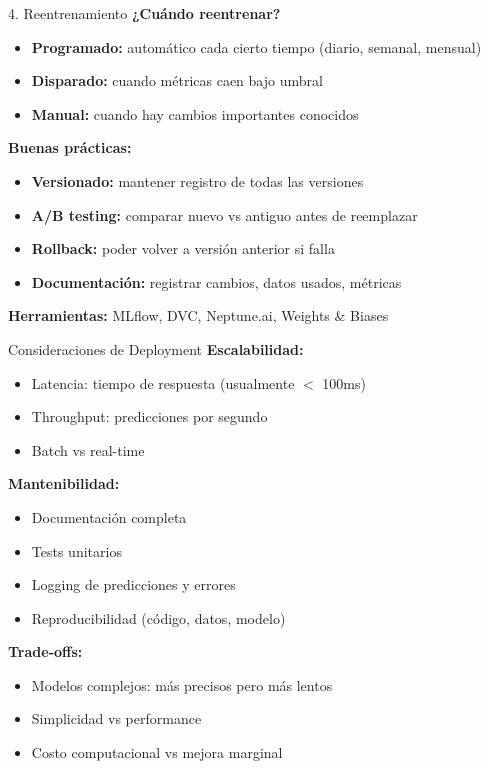 \documentclass[aspectratio=169]{beamer}
\begin{document}
\begin{frame}{4. Reentrenamiento}
\textbf{¿Cuándo reentrenar?}

\begin{itemize}
\item \textbf{Programado:} automático cada cierto tiempo (diario, semanal, mensual)
\item \textbf{Disparado:} cuando métricas caen bajo umbral
\item \textbf{Manual:} cuando hay cambios importantes conocidos
\end{itemize}

\vspace{0.3cm}

\textbf{Buenas prácticas:}
\begin{itemize}
\item \textbf{Versionado:} mantener registro de todas las versiones
\item \textbf{A/B testing:} comparar nuevo vs antiguo antes de reemplazar
\item \textbf{Rollback:} poder volver a versión anterior si falla
\item \textbf{Documentación:} registrar cambios, datos usados, métricas
\end{itemize}

\vspace{0.3cm}

\textbf{Herramientas:} MLflow, DVC, Neptune.ai, Weights \& Biases
\end{frame}

\begin{frame}{Consideraciones de Deployment}
\textbf{Escalabilidad:}
\begin{itemize}
\item Latencia: tiempo de respuesta (usualmente $<$ 100ms)
\item Throughput: predicciones por segundo
\item Batch vs real-time
\end{itemize}

\vspace{0.3cm}

\textbf{Mantenibilidad:}
\begin{itemize}
\item Documentación completa
\item Tests unitarios
\item Logging de predicciones y errores
\item Reproducibilidad (código, datos, modelo)
\end{itemize}

\vspace{0.3cm}

\textbf{Trade-offs:}
\begin{itemize}
\item Modelos complejos: más precisos pero más lentos
\item Simplicidad vs performance
\item Costo computacional vs mejora marginal
\end{itemize}
\end{frame}
\end{document}
